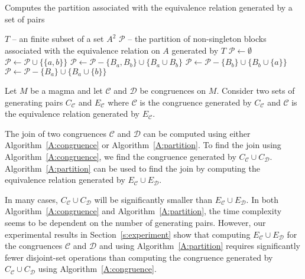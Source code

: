 \documentclass{acmconf}
\begin{document}
\begin{algorithm}
\caption{Computes the partition associated with 
the equivalence relation generated by a 
set of pairs}
\label{A:partition}
\begin{algorithmic}[1]
\REQUIRE $T$ -- an finite subset of a set $A^2$
\ENSURE $\mathcal P$ -- the partition of non-singleton
blocks associated with the 
equivalence relation on $A$ generated by $T$
\STATE $\mathcal P\leftarrow\emptyset$
         \STATE $\mathcal P\leftarrow\mathcal P\cup \{\{a,b\}\}$
         \STATE $\mathcal P\leftarrow\mathcal 
                       P-\{B_{a},B_{b}\}\cup\{B_{a}\cup B_{b}\}$
         \STATE $\mathcal P\leftarrow\mathcal 
                           P-\{B_{b}\}\cup\{B_{b}\cup\{a\}\}$
         \STATE $\mathcal P\leftarrow\mathcal 
                           P-\{B_{a}\}\cup\{B_{a}\cup\{b\}\}$
    \ENDIF
\ENDFOR
\end{algorithmic}
\end{algorithm}
 
Let $M$ be a magma and let $\mathcal C$ and 
$\mathcal D$ be congruences
on $M$. Consider two sets of generating pairs 
$C_{\mathcal C}$ and $E_{\mathcal C}$ where 
$\mathcal C$ is the congruence generated by $C_{\mathcal C}$ and
$\mathcal C$ is the equivalence relation generated by $E_{\mathcal C}$.

The join of two congruences $\mathcal C$ and $\mathcal D$
can be computed using either Algorithm~\ref{A:congruence} or
Algorithm~\ref{A:partition}. To find the join using 
Algorithm~\ref{A:congruence}, we find the congruence generated
by $C_{\mathcal C}\cup C_{\mathcal D}$. Algorithm~\ref{A:partition}
can be used to find the join by computing the equivalence relation
generated by $E_{\mathcal C}\cup E_{\mathcal D}$. 



In many cases, $C_{\mathcal C}\cup C_{\mathcal D}$ will be significantly
smaller than $E_{\mathcal C}\cup E_{\mathcal D}$. 
In both Algorithm~\ref{A:congruence}  and Algorithm~\ref{A:partition}, 
the time complexity seems to be dependent on the number of 
generating pairs. However, our 
experimental results in Section~\ref{s:experiment}
show that computing $E_{\mathcal C}\cup E_{\mathcal D}$
for the congruences $\mathcal C$ and $\mathcal D$ 
and using Algorithm~\ref{A:partition}
requires significantly 
fewer disjoint-set operations than computing the congruence
generated by $C_{\mathcal C}\cup C_{\mathcal D}$ using 
Algorithm~\ref{A:congruence}.
\end{document}
